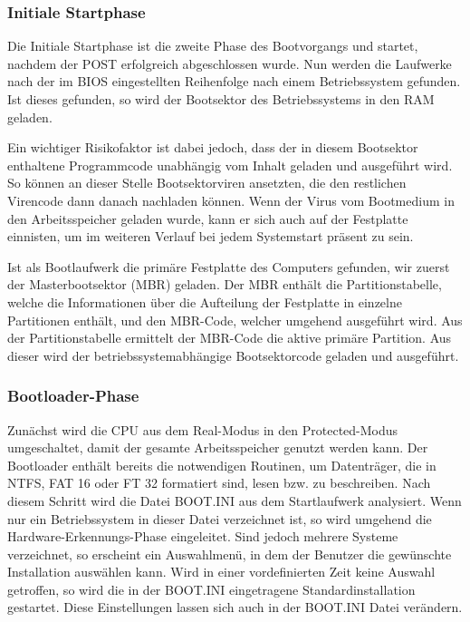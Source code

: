 \subsubsection{Initiale Startphase}
Die Initiale Startphase ist die zweite Phase des Bootvorgangs und startet, nachdem der POST erfolgreich abgeschlossen wurde. Nun werden die Laufwerke nach der im BIOS eingestellten Reihenfolge nach einem Betriebssystem gefunden. Ist dieses gefunden, so wird der Bootsektor des Betriebssystems in den RAM geladen.

Ein wichtiger Risikofaktor ist dabei jedoch, dass der in diesem Bootsektor enthaltene Programmcode unabhängig vom Inhalt geladen und ausgeführt wird.  So können an dieser Stelle Bootsektorviren ansetzten, die den restlichen Virencode dann danach nachladen können. Wenn der Virus vom Bootmedium in den Arbeitsspeicher geladen wurde, kann er sich auch auf der Festplatte einnisten, um im weiteren Verlauf bei jedem Systemstart präsent zu sein.

Ist als Bootlaufwerk die primäre Festplatte des Computers gefunden, wir zuerst der Masterbootsektor (MBR) geladen. Der MBR enthält die Partitionstabelle, welche die Informationen über die Aufteilung der Festplatte in einzelne Partitionen enthält, und den MBR-Code, welcher umgehend ausgeführt wird.  Aus der Partitionstabelle ermittelt der MBR-Code die aktive primäre Partition. Aus dieser wird der betriebssystemabhängige Bootsektorcode geladen und ausgeführt.

\subsubsection{Bootloader-Phase}
Zunächst wird die CPU aus dem Real-Modus in den Protected-Modus umgeschaltet, damit der gesamte Arbeitsspeicher genutzt werden kann. Der Bootloader enthält bereits die notwendigen Routinen, um Datenträger, die in NTFS, FAT 16 oder FT 32 formatiert sind, lesen bzw. zu beschreiben. Nach diesem Schritt wird die Datei BOOT.INI aus dem Startlaufwerk analysiert. Wenn nur ein Betriebssystem in dieser Datei verzeichnet ist, so wird umgehend die Hardware-Erkennungs-Phase eingeleitet. Sind jedoch mehrere Systeme verzeichnet, so erscheint ein Auswahlmenü, in dem der Benutzer die gewünschte Installation auswählen kann. Wird in einer vordefinierten Zeit keine Auswahl getroffen, so wird die in der BOOT.INI eingetragene Standardinstallation gestartet. Diese Einstellungen lassen sich auch in der BOOT.INI Datei verändern.

